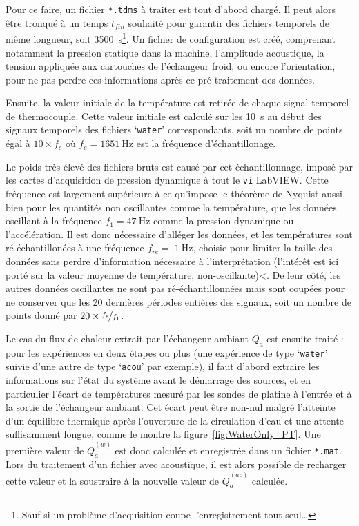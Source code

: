 Pour ce faire, un fichier \texttt{*.tdms} à traiter est tout d'abord chargé. Il peut alors être tronqué à un temps $t_{fin}$ souhaité pour garantir des fichiers temporels de même longueur, soit \qty{3500}{\second}\footnote{Sauf si un problème d'acquisition coupe l'enregistrement tout seul\dots}. Un fichier de configuration est créé, comprenant notamment la pression statique dans la machine, l'amplitude acoustique, la tension appliquée aux cartouches de l'échangeur froid, ou encore l'orientation, pour ne pas perdre ces informations après ce pré-traitement des données.\smallskip

Ensuite, la valeur initiale de la température est retirée de chaque signal temporel de thermocouple. Cette valeur initiale est calculé sur les \qty{10}{\second} au début des signaux temporels des fichiers `\texttt{water}' correspondants, soit un nombre de points égal à $10 \times f_{e}$ où $f_{e}=\qty{1651}{\hertz}$ est la fréquence d'échantillonage.\smallskip

Le poids très élevé des fichiers bruts est causé par cet échantillonnage, imposé par les cartes d'acquisition de pression dynamique à tout le \texttt{vi} LabVIEW. Cette fréquence est largement supérieure à ce qu'impose le théorème de Nyquist aussi bien pour les quantités non oscillantes comme la température, que les données oscillant à la fréquence $f_1=\qty{47}{\hertz}$ comme la pression dynamique ou l'accélération. Il est donc nécessaire d'alléger les données, et les températures sont ré-échantillonées à une fréquence $f_{re}=\qty{.1}{\hertz}$, choisie pour limiter la taille des données sans perdre d'information nécessaire à l'interprétation (l'intérêt est ici porté sur la valeur moyenne de température, non-oscillante)<. De leur côté, les autres données oscillantes ne sont pas ré-échantillonnées mais sont coupées pour ne conserver que les \num{20} dernières périodes entières des signaux, soit un nombre de points donné par $20 \times \nicefrac{f_e}{f_1}$.\smallskip

Le cas du flux de chaleur extrait par l'échangeur ambiant $\dot Q_a$ est ensuite traité : pour les expériences en deux étapes ou plus (une expérience de type `\texttt{water}' suivie d'une autre de type `\texttt{acou}' par exemple), il faut d'abord extraire les informations sur l'état du système avant le démarrage des sources, et en particulier l'écart de températures mesuré par les sondes de platine à l'entrée et à la sortie de l'échangeur ambiant. Cet écart peut être non-nul malgré l'atteinte d'un équilibre thermique après l'ouverture de la circulation d'eau et une attente suffisamment longue, comme le montre la figure~\ref{fig:WaterOnly_PT}. Une première valeur de $\dot Q_a^{(w)}$ est donc calculée et enregistrée dans un fichier \texttt{*.mat}. Lors du traitement d'un fichier avec acoustique, il est alors possible de recharger cette valeur et la soustraire à la nouvelle valeur de $\dot Q_a^{(ac)}$ calculée.\smallskip

